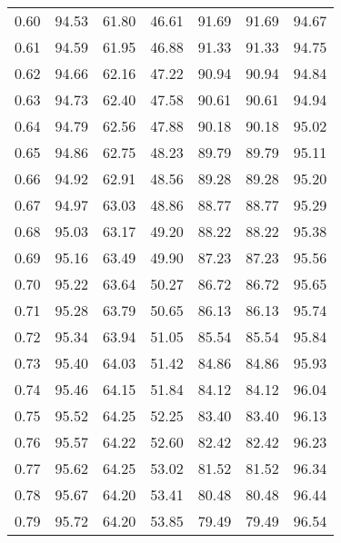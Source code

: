 \begin{tabular}{|c|c|c|c|c|c|c|}
      0.60 &     94.53 &     61.80 &      46.61 &   91.69 &      91.69 &         94.67 \\
      0.61 &     94.59 &     61.95 &      46.88 &   91.33 &      91.33 &         94.75 \\
      0.62 &     94.66 &     62.16 &      47.22 &   90.94 &      90.94 &         94.84 \\
      0.63 &     94.73 &     62.40 &      47.58 &   90.61 &      90.61 &         94.94 \\
      0.64 &     94.79 &     62.56 &      47.88 &   90.18 &      90.18 &         95.02 \\
      0.65 &     94.86 &     62.75 &      48.23 &   89.79 &      89.79 &         95.11 \\
      0.66 &     94.92 &     62.91 &      48.56 &   89.28 &      89.28 &         95.20 \\
      0.67 &     94.97 &     63.03 &      48.86 &   88.77 &      88.77 &         95.29 \\
      0.68 &     95.03 &     63.17 &      49.20 &   88.22 &      88.22 &         95.38 \\
      0.69 &     95.16 &     63.49 &      49.90 &   87.23 &      87.23 &         95.56 \\
      0.70 &     95.22 &     63.64 &      50.27 &   86.72 &      86.72 &         95.65 \\
      0.71 &     95.28 &     63.79 &      50.65 &   86.13 &      86.13 &         95.74 \\
      0.72 &     95.34 &     63.94 &      51.05 &   85.54 &      85.54 &         95.84 \\
      0.73 &     95.40 &     64.03 &      51.42 &   84.86 &      84.86 &         95.93 \\
      0.74 &     95.46 &     64.15 &      51.84 &   84.12 &      84.12 &         96.04 \\
      0.75 &     95.52 &     64.25 &      52.25 &   83.40 &      83.40 &         96.13 \\
      0.76 &     95.57 &     64.22 &      52.60 &   82.42 &      82.42 &         96.23 \\
      0.77 &     95.62 &     64.25 &      53.02 &   81.52 &      81.52 &         96.34 \\
      0.78 &     95.67 &     64.20 &      53.41 &   80.48 &      80.48 &         96.44 \\
      0.79 &     95.72 &     64.20 &      53.85 &   79.49 &      79.49 &         96.54 \\

\end{tabular}
